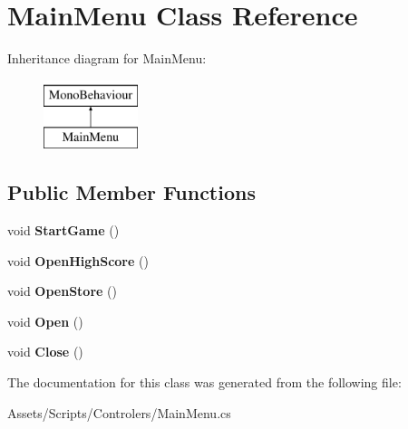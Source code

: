 \hypertarget{class_main_menu}{}\section{Main\+Menu Class Reference}
\label{class_main_menu}
Inheritance diagram for Main\+Menu\+:\begin{figure}[H]
\begin{center}
\leavevmode
\includegraphics[height=2.000000cm]{class_main_menu}
\end{center}
\end{figure}
\subsection*{Public Member Functions}
\begin{DoxyCompactItemize}
\item 
void {\bfseries Start\+Game} ()\hypertarget{class_main_menu_ac2a74cb6e3c827e2a8db8c41141f0984}{}\label{class_main_menu_ac2a74cb6e3c827e2a8db8c41141f0984}

\item 
void {\bfseries Open\+High\+Score} ()\hypertarget{class_main_menu_a157fa66010637059917a4191f32a7860}{}\label{class_main_menu_a157fa66010637059917a4191f32a7860}

\item 
void {\bfseries Open\+Store} ()\hypertarget{class_main_menu_a107d996bd5f040eddc39a9ffddc3fae2}{}\label{class_main_menu_a107d996bd5f040eddc39a9ffddc3fae2}

\item 
void {\bfseries Open} ()\hypertarget{class_main_menu_adaa912235a32e18e09c80dd580f7b3a9}{}\label{class_main_menu_adaa912235a32e18e09c80dd580f7b3a9}

\item 
void {\bfseries Close} ()\hypertarget{class_main_menu_a5ce8073a56083189a3a5535e8cdac7df}{}\label{class_main_menu_a5ce8073a56083189a3a5535e8cdac7df}

\end{DoxyCompactItemize}


The documentation for this class was generated from the following file\+:\begin{DoxyCompactItemize}
\item 
Assets/\+Scripts/\+Controlers/Main\+Menu.\+cs\end{DoxyCompactItemize}

